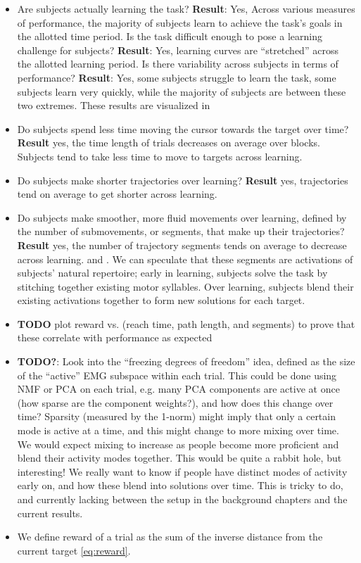 \documentclass[../main.tex]{subfiles}
\begin{document}
\begin{itemize}
    \setlength\itemsep{0em}
    \item Are subjects actually learning the task? \textbf{Result}: Yes, Across various measures of performance, the majority of subjects learn to achieve the task’s goals in the allotted time period. Is the task difficult enough to pose a learning challenge for subjects? \textbf{Result}: Yes, learning curves are ``stretched'' across the allotted learning period. Is there variability across subjects in terms of performance? \textbf{Result}: Yes, some subjects struggle to learn the task, some subjects learn very quickly, while the majority of subjects are between these two extremes. These results are visualized in 
    \item Do subjects spend less time moving the cursor towards the target over time? \textbf{Result} yes, the time length of trials decreases on average over blocks. Subjects tend to take less time to move to targets across learning. 
    \item Do subjects make shorter trajectories over learning? \textbf{Result} yes, trajectories tend on average to get shorter across learning. 
    \item Do subjects make smoother, more fluid movements over learning, defined by the number of submovements, or segments, that make up their trajectories? \textbf{Result} yes, the number of trajectory segments tends on average to decrease across learning.  and . We can speculate that these segments are activations of subjects' natural repertoire; early in learning, subjects solve the task by stitching together existing motor syllables. Over learning, subjects blend their existing activations together to form new solutions for each target.
    \item \textbf{TODO} plot reward vs. (reach time, path length, and segments) to prove that these correlate with performance as expected
    \item \textbf{TODO?}: Look into the ``freezing degrees of freedom'' idea, defined as the size of the ``active'' EMG subspace within each trial. This could be done using NMF or PCA on each trial, e.g. many PCA components are active at once (how sparse are the component weights?), and how does this change over time? Sparsity (measured by the 1-norm) might imply that only a certain mode is active at a time, and this might change to more mixing over time. We would expect mixing to increase as people become more proficient and blend their activity modes together. This would be quite a rabbit hole, but interesting! We really want to know if people have distinct modes of activity early on, and how these blend into solutions over time. This is tricky to do, and currently lacking between the setup in the background chapters and the current results.
    \item We define reward of a trial as the sum of the inverse distance from the current target \cref{eq:reward}.
\end{itemize}
\end{document}
